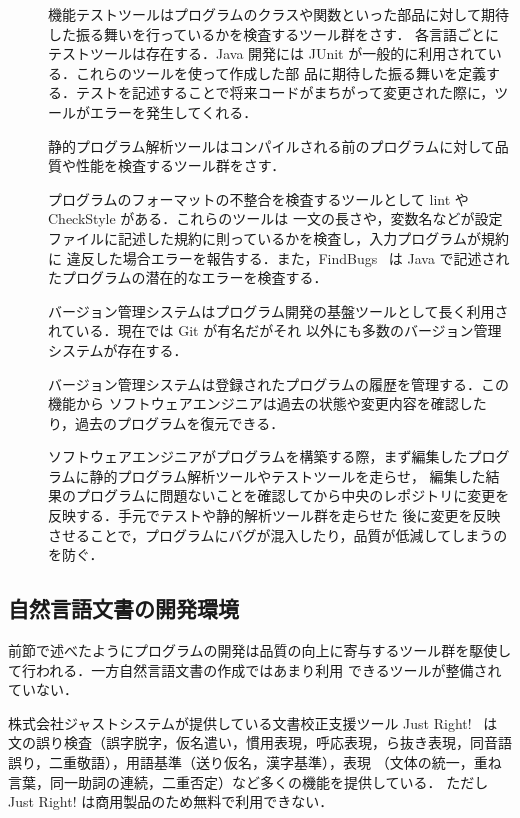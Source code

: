 \documentclass[a4paper, 10pt]{jarticle}
\begin{document}
\begin{description}
 \item[] 
   機能テストツールはプログラムのクラスや関数といった部品に対して期待した振る舞いを行っているかを検査するツール群をさす．
   各言語ごとにテストツールは存在する．Java 開発には JUnit が一般的に利用されている．これらのツールを使って作成した部
   品に期待した振る舞いを定義する．テストを記述することで将来コードがまちがって変更された際に，ツールがエラーを発生してくれる．
 \item[]
   静的プログラム解析ツールはコンパイルされる前のプログラムに対して品質や性能を検査するツール群をさす．
   
   プログラムのフォーマットの不整合を検査するツールとして lint や CheckStyle がある．これらのツールは
   一文の長さや，変数名などが設定ファイルに記述した規約に則っているかを検査し，入力プログラムが規約に
   違反した場合エラーを報告する．また，FindBugs~\cite{findbugs} は Java で記述されたプログラムの潜在的なエラーを検査する．
\item[]
  バージョン管理システムはプログラム開発の基盤ツールとして長く利用されている．現在では Git が有名だがそれ
  以外にも多数のバージョン管理システムが存在する．

  バージョン管理システムは登録されたプログラムの履歴を管理する．この機能から
  ソフトウェアエンジニアは過去の状態や変更内容を確認したり，過去のプログラムを復元できる．
  
  ソフトウェアエンジニアがプログラムを構築する際，まず編集したプログラムに静的プログラム解析ツールやテストツールを走らせ，
  編集した結果のプログラムに問題ないことを確認してから中央のレポジトリに変更を反映する．手元でテストや静的解析ツール群を走らせた
  後に変更を反映させることで，プログラムにバグが混入したり，品質が低減してしまうのを防ぐ．
\end{description}

\subsection{自然言語文書の開発環境}
前節で述べたようにプログラムの開発は品質の向上に寄与するツール群を駆使して行われる．一方自然言語文書の作成ではあまり利用
できるツールが整備されていない．

株式会社ジャストシステムが提供している文書校正支援ツール Just Right!~\cite{justright} は
文の誤り検査（誤字脱字，仮名遣い，慣用表現，呼応表現，ら抜き表現，同音語誤り，二重敬語），用語基準（送り仮名，漢字基準），表現
（文体の統一，重ね言葉，同一助詞の連続，二重否定）など多くの機能を提供している．
ただし Just Right! は商用製品のため無料で利用できない．
\end{document}
